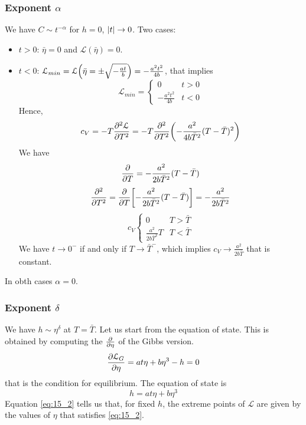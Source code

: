 \documentclass[../main/main.tex]{subfiles}
\begin{document}
\subsubsection{Exponent \( \alpha  \)}
We have \( C \sim t^{-\alpha } \) for  \( h=0 \), \( \abs{t}  \rightarrow 0 \). Two cases:
\begin{itemize}
\item \( t>0 \): \( \bar{\eta }=0  \) and \( \mathcal{L} (\bar{\eta } )= 0 \).
\item \( t < 0 \): \( \mathcal{L}_{min} = \mathcal{L} \qty(\bar{\eta } = \pm \sqrt{- \frac{at}{b}}  ) = - \frac{a^2t^2}{4b}  \), that implies
\begin{equation}
  \mathcal{L}_{min} =
    \begin{cases}
     0 & t > 0\\
     - \frac{a^2 t^2}{4b} & t < 0
    \end{cases}
\end{equation}
Hence,
\begin{equation}
  c_V = - T \pdv[2]{\mathcal{L}}{T} = - T \pdv[2]{}{T} \qty(- \frac{a^2}{4b \bar{T}^2 }(T- \bar{T} )^2)
\end{equation}
We have
\begin{equation}
  \pdv{}{T} (\dots) = - \frac{a^2}{2 b \bar{T}^2 } (T- \bar{T} )
\end{equation}
\begin{equation}
  \pdv[2]{}{T} = \pdv{}{T} \qty[ - \frac{a^2}{2 b \bar{T}^2 } (T- \bar{T} )]   = - \frac{a^2}{2 b \bar{T}^2 }
\end{equation}
\begin{equation}
c_V
  \begin{cases}
   0 & T > \bar{T} \\
   \frac{a^2}{2 b \bar{T}^2 } T & T < \bar{T}
  \end{cases}
\end{equation}
We have \( t \rightarrow 0^- \) if and only if \( T \rightarrow \bar{T}^-  \), which implies \( c_V \rightarrow \frac{a^2}{2b \bar{T} } \) that is constant.
\end{itemize}
In obth cases \( \alpha =0 \).
\subsubsection{Exponent \( \delta  \)}
We have \( h \sim \eta ^ \delta  \) at \( T = \bar{T}  \). Let us start from the equation of state. This is obtained by computing the \( \pdv{}{\eta }  \) of the Gibbs version.
\begin{equation}
  \pdv{\mathcal{L}_G}{\eta } = a t \eta + b \eta ^3 - h = 0
\end{equation}
that is the condition for equilibrium. The equation of state is
\begin{equation}
  h = a t \eta + b \eta ^3
  \label{eq:15_2}
\end{equation}
Equation \eqref{eq:15_2} tells us that, for fixed \( h \), the extreme points of \( \mathcal{L} \) are given by the values of \( \eta  \) that satisfies \eqref{eq:15_2}.
\end{document}
